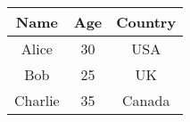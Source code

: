 \documentclass{article}
\begin{document}
\begin{tabular}{c|c|c}
\hline
Name & Age & Country \\
\hline
Alice & 30 & USA \\
\hline
Bob & 25 & UK \\
\hline
Charlie & 35 & Canada \\
\hline
\end{tabular}
\end{document}
